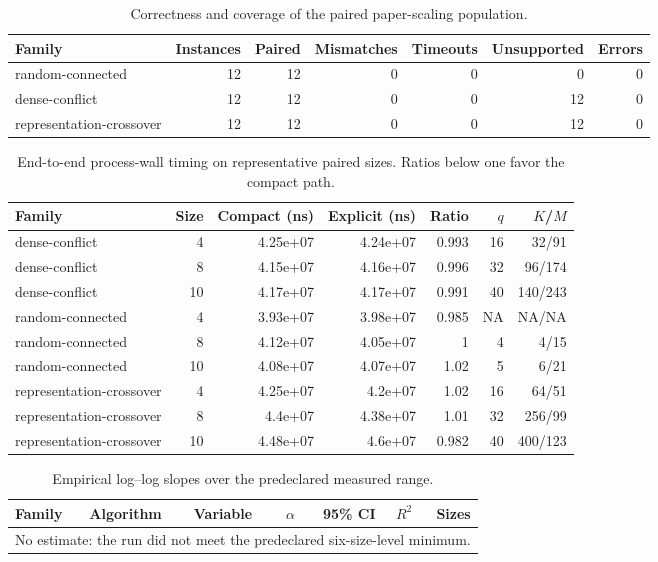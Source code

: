 \begin{table}[t]
\caption{Correctness and coverage of the paired paper-scaling population.}
\label{tab:paper-scaling-coverage}
\begin{tabular}{lrrrrrr}
\toprule
Family & Instances & Paired & Mismatches & Timeouts & Unsupported & Errors \\
\midrule
random-connected & 12 & 12 & 0 & 0 & 0 & 0 \\
dense-conflict & 12 & 12 & 0 & 0 & 12 & 0 \\
representation-crossover & 12 & 12 & 0 & 0 & 12 & 0 \\
\bottomrule
\end{tabular}
\end{table}

\begin{table}[t]
\caption{End-to-end process-wall timing on representative paired sizes. Ratios below one favor the compact path.}
\label{tab:paper-scaling-timing}
\begin{tabular}{lrrrrrr}
\toprule
Family & Size & Compact (ns) & Explicit (ns) & Ratio & $q$ & $K$/$M$ \\
\midrule
dense-conflict & 4 & 4.25e+07 & 4.24e+07 & 0.993 & 16 & 32/91 \\
dense-conflict & 8 & 4.15e+07 & 4.16e+07 & 0.996 & 32 & 96/174 \\
dense-conflict & 10 & 4.17e+07 & 4.17e+07 & 0.991 & 40 & 140/243 \\
random-connected & 4 & 3.93e+07 & 3.98e+07 & 0.985 & NA & NA/NA \\
random-connected & 8 & 4.12e+07 & 4.05e+07 & 1 & 4 & 4/15 \\
random-connected & 10 & 4.08e+07 & 4.07e+07 & 1.02 & 5 & 6/21 \\
representation-crossover & 4 & 4.25e+07 & 4.2e+07 & 1.02 & 16 & 64/51 \\
representation-crossover & 8 & 4.4e+07 & 4.38e+07 & 1.01 & 32 & 256/99 \\
representation-crossover & 10 & 4.48e+07 & 4.6e+07 & 0.982 & 40 & 400/123 \\
\bottomrule
\end{tabular}
\end{table}

\begin{table}[t]
\caption{Empirical log--log slopes over the predeclared measured range.}
\label{tab:paper-scaling-exponents}
\begin{tabular}{lllrrrr}
\toprule
Family & Algorithm & Variable & $\alpha$ & 95\% CI & $R^2$ & Sizes \\
\midrule
\multicolumn{7}{l}{No estimate: the run did not meet the predeclared six-size-level minimum.} \\
\bottomrule
\end{tabular}
\end{table}

